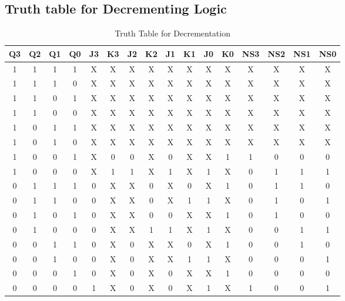 \documentclass[a4paper,12pt]{article}
\begin{document}
\newpage






\subsection{Truth table for Decrementing Logic}
\begin{table}[H]
    \centering
    \renewcommand{\arraystretch}{1.3}
    \begin{tabular}{|c|c|c|c|c|c|c|c|c|c|c|c|c|c|c|c|}
        \hline
        \textbf{Q3} & \textbf{Q2} & \textbf{Q1} & \textbf{Q0} & \textbf{J3} & \textbf{K3} & \textbf{J2} & \textbf{K2} & \textbf{J1} & \textbf{K1} & \textbf{J0} & \textbf{K0} & \textbf{NS3} & \textbf{NS2} & \textbf{NS1} & \textbf{NS0} \\
        \hline
        1 & 1 & 1 & 1 & X&X & X&X &X &X &X&X& X&X & X&X \\
        1 & 1 & 1 & 0 & X& X& X& X& X& X& X&X&X&X & X&X \\
        1 & 1 & 0 & 1 & X&X & X&X & X&X &X&X& X&X & X&X\\
        1 & 1 & 0 & 0 & X&X &X & X& X& X& X&X&X&X & X&X \\
        1 & 0 & 1 & 1 & X&X & X&X &X & X&X&X& X&X & X&X \\
        1 & 0 & 1 & 0 & X&X & X& X& X& X&X&X& X&X & X&X\\
        \hline
        1 & 0 & 0 & 1 &X &0 &0 &X &0 &X &X &1 & 1 & 0 & 0 & 0 \\
        1 & 0 & 0 & 0 &X &1 &1 &X &1 &X &1 &X & 0 & 1 & 1 & 1 \\
        0 & 1 & 1 & 1 &0 &X &X &0 &X &0 &X &1 & 0 & 1 & 1 & 0 \\
        0 & 1 & 1 & 0 &0 &X &X &0 &X &1 &1 &X & 0 & 1 & 0 & 1 \\
        0 & 1 & 0 & 1 &0 &X &X &0 &0 &X &X &1 & 0 & 1 & 0 & 0 \\
        0 & 1 & 0 & 0 &0 &X &X &1 &1 &X &1 &X & 0 & 0 & 1 & 1 \\
        0 & 0 & 1 & 1 &0 &X &0 &X &X &0 &X &1 & 0 & 0 & 1 & 0 \\
        0 & 0 & 1 & 0 &0 &X &0 &X &X &1 &1 &X & 0 & 0 & 0 & 1 \\
        0 & 0 & 0 & 1 &0 &X &0 &X &0 &X &X &1 & 0 & 0 & 0 & 0 \\
        0 & 0 & 0 & 0 &1 &X &0 &X &0 &X &1 &X & 1 & 0 & 0 & 1 \\
        \hline
    \end{tabular}
    \caption{Truth Table for Decrementation}
    \label{tab:truth_table}
\end{table}
\newpage
\end{document}

